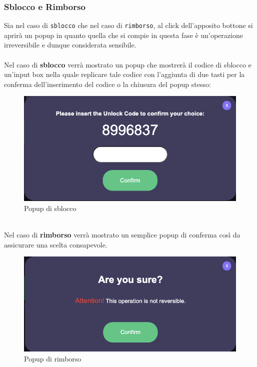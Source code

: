             \subsubsection{Sblocco e Rimborso}
       Sia nel caso di \texttt{sblocco} che nel caso di \texttt{rimborso}, al click dell'apposito bottone si aprirà un popup in quanto quella che si compie in questa fase è un'operazione irreversibile e dunque considerata sensibile.\\\\
        Nel caso di \textbf{sblocco} verrà mostrato un popup che mostrerà il codice di sblocco e un'input box nella quale replicare tale codice con l'aggiunta di due tasti per la conferma dell'inserimento del codice o la chiusura del popup stesso:
        \begin{figure}[H]
            \centering
            \includegraphics[scale=0.3]{immagini/Checkout/UnlockPopUp.png} 
            \caption{Popup di sblocco}
        \end{figure}
        \textbf{}\\
        Nel caso di \textbf{rimborso} verrà mostrato un semplice popup di conferma così da assicurare una scelta consapevole.
        \begin{figure}[H]
            \centering
            \includegraphics[scale=0.3]{immagini/Checkout/RefundPopUp.png} 
            \caption{Popup di rimborso}
        \end{figure}
